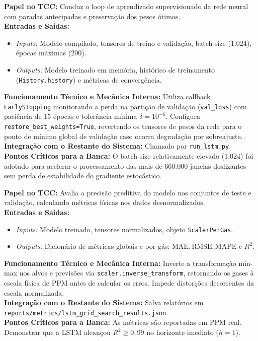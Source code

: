 \documentclass[10pt,a4paper]{article}
\begin{document}
\begin{filebox}
\textbf{Papel no TCC:} Conduz o loop de aprendizado supervisionado da rede neural com paradas antecipadas e preservação dos pesos ótimos.\\
\textbf{Entradas e Saídas:}
\begin{itemize}[leftmargin=*,itemsep=1pt]
  \item \textit{Inputs:} Modelo compilado, tensores de treino e validação, batch size ($1.024$), épocas máximas ($200$).
  \item \textit{Outputs:} Modelo treinado em memória, histórico de treinamento (\texttt{History.history}) e métricas de convergência.
\end{itemize}
\textbf{Funcionamento Técnico e Mecânica Interna:} Utiliza callback \texttt{EarlyStopping} monitorando a perda na partição de validação (\texttt{val\_loss}) com paciência de 15 épocas e tolerância mínima $\delta = 10^{-6}$. Configura \texttt{restore\_best\_weights=True}, revertendo os tensores de pesos da rede para o ponto de mínimo global de validação caso ocorra degradação por sobreajuste.\\
\textbf{Integração com o Restante do Sistema:} Chamado por \texttt{run\_lstm.py}.\\
\textbf{Pontos Críticos para a Banca:} O batch size relativamente elevado ($1.024$) foi adotado para acelerar o processamento das mais de 660.000 janelas deslizantes sem perda de estabilidade do gradiente estocástico.
\end{filebox}

\begin{filebox}
\textbf{Papel no TCC:} Avalia a precisão preditiva do modelo nos conjuntos de teste e validação, calculando métricas físicas nos dados desnormalizados.\\
\textbf{Entradas e Saídas:}
\begin{itemize}[leftmargin=*,itemsep=1pt]
  \item \textit{Inputs:} Modelo treinado, tensores normalizados, objeto \texttt{ScalerPerGas}.
  \item \textit{Outputs:} Dicionário de métricas globais e por gás: $\text{MAE}, \text{RMSE}, \text{MAPE}$ e $R^2$.
\end{itemize}
\textbf{Funcionamento Técnico e Mecânica Interna:} Inverte a transformação min-max nos alvos e previsões via \texttt{scaler.inverse\_transform}, retornando os gases à escala física de PPM antes de calcular os erros. Impede distorções decorrentes da escala normalizada.\\
\textbf{Integração com o Restante do Sistema:} Salva relatórios em \texttt{reports/metrics/lstm\_grid\_search\_results.json}.\\
\textbf{Pontos Críticos para a Banca:} As métricas são reportadas em PPM real. Demonstrar que a LSTM alcançou $R^2 \ge 0,99$ no horizonte imediato ($h=1$).
\end{filebox}
\end{document}
